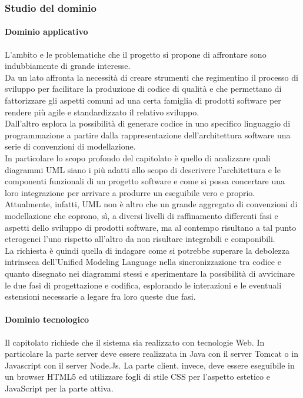 		\subsubsection{Studio del dominio}
			\paragraph{Dominio applicativo}
			L'ambito e le problematiche che il progetto si propone di affrontare sono indubbiamente di grande interesse. 
			\\Da un lato affronta la necessità di 
			creare strumenti che regimentino il processo di sviluppo per facilitare la produzione di codice di qualità e che permettano di fattorizzare gli 
			aspetti comuni ad una certa famiglia di prodotti software per rendere più agile e standardizzato il relativo sviluppo.
			\\Dall'altro esplora la possibilità di generare codice in uno specifico linguaggio di programmazione a partire dalla rappresentazione dell'architettura 
			software una serie di convenzioni di modellazione.
			\\In particolare lo scopo profondo del capitolato è quello di analizzare quali diagrammi UML siano i più adatti allo scopo di descrivere l'architettura 
			e le componenti funzionali di un progetto software e come si possa concertare una loro integrazione per arrivare a produrre un eseguibile vero e proprio. 
			\\Attualmente, infatti, UML non è altro che un grande aggregato di convenzioni di modellazione che coprono, sì, a diversi livelli di raffinamento differenti 
			fasi e aspetti dello sviluppo di prodotti software, ma al contempo risultano 
			a tal punto eterogenei l'uno rispetto all'altro da non risultare integrabili e componibili. 
			\\La richiesta è quindi quella di indagare come si potrebbe superare la debolezza intrinseca dell'Unified Modeling Language nella sincronizzazione tra 
			codice e quanto disegnato nei diagrammi stessi e sperimentare la possibilità di avvicinare le due fasi di progettazione e codifica, esplorando le 
			interazioni e le eventuali estensioni necessarie a legare fra loro queste due fasi.
			\paragraph{Dominio tecnologico}
			Il capitolato richiede che il sistema sia realizzato con tecnologie Web. In particolare la parte server deve essere realizzata in Java con il server 
			Tomcat o in Javascript con il server Node.Js. La parte client, invece, deve essere eseguibile in un browser HTML5 ed utilizzare fogli di stile CSS per 
			l'aspetto estetico e JavaScript per la parte attiva.

